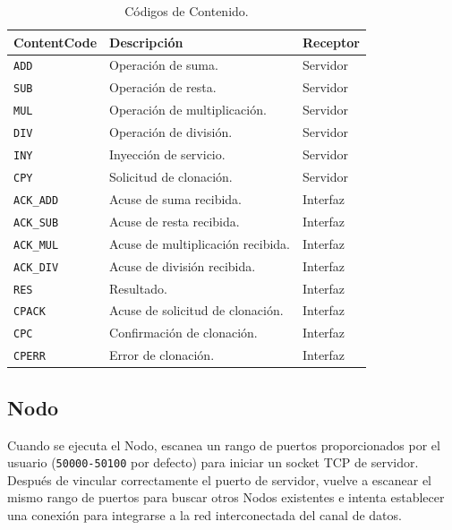 \documentclass[conference,compsoc]{IEEEtran}
\begin{document}
\begin{table}[hb]
    \centering
    \caption{Códigos de Contenido.}
    \label{tab:cc}
    \begin{tabular}{|l|l|l|}
    \hline
    \textbf{ContentCode} & \textbf{Descripción}              & \textbf{Receptor} \\ \hline
    \texttt{ADD}         & Operación de suma.                & Servidor          \\ \hline
    \texttt{SUB}         & Operación de resta.               & Servidor          \\ \hline
    \texttt{MUL}         & Operación de multiplicación.      & Servidor          \\ \hline
    \texttt{DIV}         & Operación de división.            & Servidor          \\ \hline
    \texttt{INY}         & Inyección de servicio.            & Servidor          \\ \hline
    \texttt{CPY}         & Solicitud de clonación.           & Servidor          \\ \hline
    \texttt{ACK\_ADD}    & Acuse de suma recibida.           & Interfaz          \\ \hline
    \texttt{ACK\_SUB}    & Acuse de resta recibida.          & Interfaz          \\ \hline
    \texttt{ACK\_MUL}    & Acuse de multiplicación recibida. & Interfaz          \\ \hline
    \texttt{ACK\_DIV}    & Acuse de división recibida.       & Interfaz          \\ \hline
    \texttt{RES}         & Resultado.                        & Interfaz          \\ \hline
    \texttt{CPACK}       & Acuse de solicitud de clonación.  & Interfaz          \\ \hline
    \texttt{CPC}         & Confirmación de clonación.        & Interfaz          \\ \hline
    \texttt{CPERR}       & Error de clonación.               & Interfaz          \\ \hline
    \end{tabular}
\end{table}

\subsection{Nodo}

Cuando se ejecuta el Nodo, escanea un rango de puertos proporcionados por el usuario (\texttt{50000-50100} por defecto) para iniciar un socket TCP de servidor. Después de vincular correctamente el puerto de servidor, vuelve a escanear el mismo rango de puertos para buscar otros Nodos existentes e intenta establecer una conexión para integrarse a la red interconectada del canal de datos.
\end{document}

